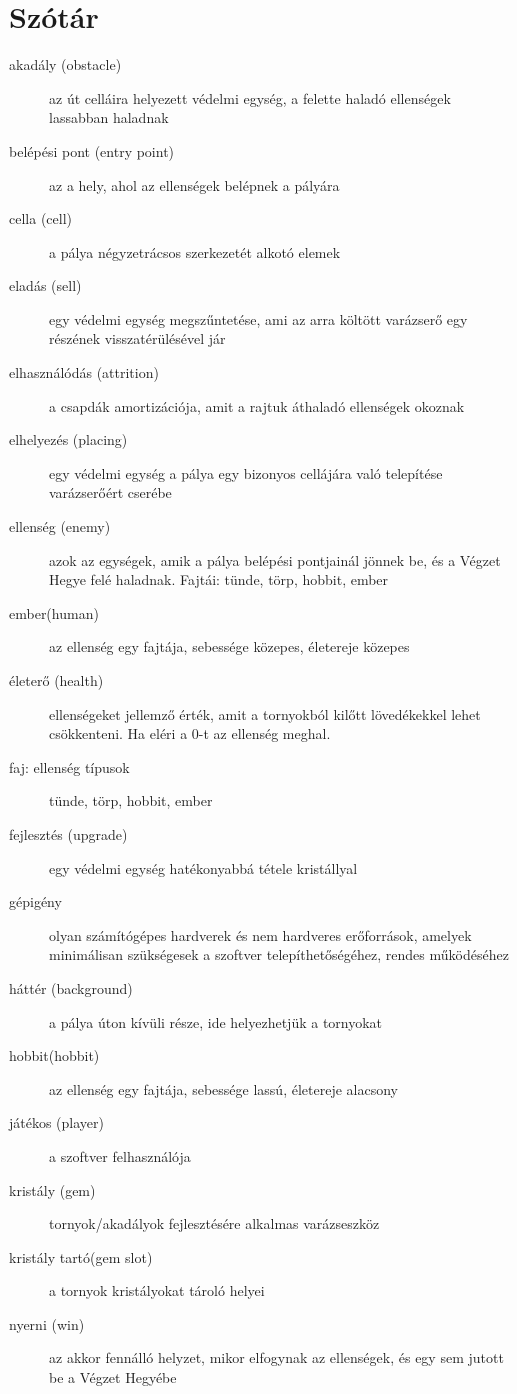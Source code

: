 \section{Szótár}
\begin{description}

\item[akadály (obstacle)] az út celláira helyezett védelmi egység, a felette haladó ellenségek lassabban haladnak
\item[belépési pont (entry point)] az a hely, ahol az ellenségek belépnek a pályára
\item[cella (cell)] a pálya négyzetrácsos szerkezetét alkotó elemek
\item[eladás (sell)] egy védelmi egység megszűntetése, ami az arra költött varázserő egy részének visszatérülésével jár
\item[elhasználódás (attrition)] a csapdák amortizációja, amit a rajtuk áthaladó ellenségek okoznak
\item[elhelyezés (placing)] egy védelmi egység a pálya egy bizonyos cellájára való telepítése varázserőért cserébe
\item[ellenség (enemy)] azok az egységek, amik a pálya belépési pontjainál jönnek be, és a Végzet Hegye felé haladnak. Fajtái: tünde, törp, hobbit, ember
\item[ember(human)] az ellenség egy fajtája, sebessége közepes, életereje közepes
\item[életerő (health)] ellenségeket jellemző érték, amit a tornyokból kilőtt lövedékekkel lehet csökkenteni. Ha eléri a 0-t az ellenség meghal.
\item[faj: ellenség típusok] tünde, törp, hobbit, ember
\item[fejlesztés (upgrade)] egy védelmi egység hatékonyabbá tétele kristállyal
\item[gépigény] olyan számítógépes hardverek és nem hardveres erőforrások, amelyek minimálisan szükségesek a szoftver telepíthetőségéhez, rendes működéséhez
\item[háttér (background)] a pálya úton kívüli része, ide helyezhetjük a tornyokat
\item[hobbit(hobbit)] az ellenség egy fajtája, sebessége lassú, életereje alacsony
\item[játékos (player)] a szoftver felhasználója
\item[kristály (gem)] tornyok/akadályok fejlesztésére alkalmas varázseszköz
\item[kristály tartó(gem slot)] a tornyok kristályokat tároló helyei
\item[nyerni (win)] az akkor fennálló helyzet, mikor elfogynak az ellenségek, és egy sem jutott be a Végzet Hegyébe

\end{description}
